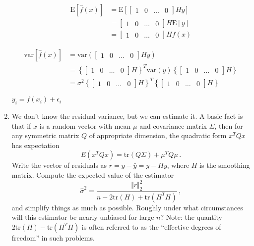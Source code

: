 \documentclass[10pt]{article}
\begin{document}
\begin{enumerate}[label=(\Alph*)]
        
        \begin{align*}
            \text{E} \left[ \hat{f}(x) \right] &= \text{E} \left[ \begin{bmatrix} 1 & 0 & \dots & 0\end{bmatrix} H y\right] \\
            &= \begin{bmatrix} 1 & 0 & \dots & 0\end{bmatrix} H \text{E}[y] \\
            &= \begin{bmatrix} 1 & 0 & \dots & 0\end{bmatrix} H f(x)
        \end{align*}

        \begin{align*}
            \text{var}[\hat{f}(x)] &= \text{var}(\begin{bmatrix} 1 & 0 & \dots & 0\end{bmatrix} H y) \\
            & = \left \{ \begin{bmatrix} 1 & 0 & \dots & 0\end{bmatrix} H \right \}^T \text{var}(y) \left \{ \begin{bmatrix} 1 & 0 & \dots & 0\end{bmatrix} H \right \} \\
            & = \sigma^2 \left \{ \begin{bmatrix} 1 & 0 & \dots & 0\end{bmatrix} H \right \}^T \left \{ \begin{bmatrix} 1 & 0 & \dots & 0\end{bmatrix} H \right \}
        \end{align*}

        $y_i = f(x_i) + \epsilon_i$

        \item We don't know the residual variance, but we can estimate it.  A basic fact is that if $x$ is a random vector with mean $\mu$ and covariance matrix $\Sigma$, then for any symmetric matrix $Q$ of appropriate dimension, the quadratic form $x^T Q x$ has expectation
        $$
        E(x^T Q x) = \mbox{tr}(Q \Sigma) + \mu^T Q \mu \, .
        $$
        Write the vector of residuals as $r = y - \hat{y} = y - Hy$, where $H$ is the smoothing matrix.  Compute the expected value of the estimator
        $$
        \hat{\sigma}^2 = \frac{\Vert r \Vert_2^2}{n - 2\mbox{tr}(H) + \mbox{tr}(H^T H)} \, ,
        $$
        and simplify things as much as possible.  Roughly under what circumstances will this estimator be nearly unbiased for large $n$?  Note: the quantity $2\mbox{tr}(H) - \mbox{tr}(H^T H)$ is often referred to as the ``effective degrees of freedom'' in such problems.


\end{enumerate}
\end{document}
